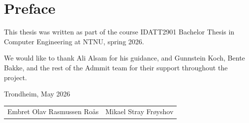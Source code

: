 \chapter*{Preface}

This thesis was written as part of the course IDATT2901 Bachelor Thesis in Computer
Engineering at NTNU, spring 2026.

We would like to thank Ali Alsam for his guidance, and Gunnstein Koch, Bente
Bakke, and the rest of the Admmit team for their support throughout the
project.

\vspace{2cm}
\noindent
Trondheim, May 2026

\vspace{1cm}
\noindent
\begin{tabular}{ll}
Embret Olav Rasmussen Roås & Mikael Stray Frøyshov
\end{tabular}
